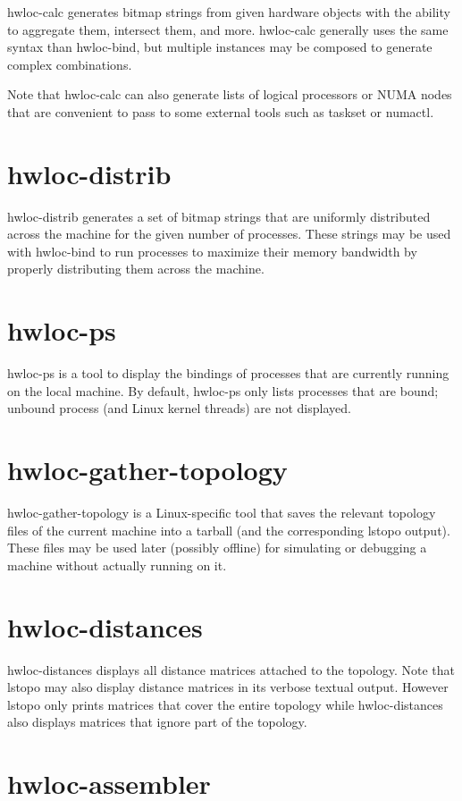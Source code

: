hwloc-\/calc generates bitmap strings from given hardware objects with the ability to aggregate them, intersect them, and more. hwloc-\/calc generally uses the same syntax than hwloc-\/bind, but multiple instances may be composed to generate complex combinations.

Note that hwloc-\/calc can also generate lists of logical processors or NUMA nodes that are convenient to pass to some external tools such as taskset or numactl.\hypertarget{a00002_cli_hwloc_distrib}{}\section{hwloc-\/distrib}\label{a00002_cli_hwloc_distrib}
hwloc-\/distrib generates a set of bitmap strings that are uniformly distributed across the machine for the given number of processes. These strings may be used with hwloc-\/bind to run processes to maximize their memory bandwidth by properly distributing them across the machine.\hypertarget{a00002_cli_hwloc_ps}{}\section{hwloc-\/ps}\label{a00002_cli_hwloc_ps}
hwloc-\/ps is a tool to display the bindings of processes that are currently running on the local machine. By default, hwloc-\/ps only lists processes that are bound; unbound process (and Linux kernel threads) are not displayed.\hypertarget{a00002_cli_hwloc_gather}{}\section{hwloc-\/gather-\/topology}\label{a00002_cli_hwloc_gather}
hwloc-\/gather-\/topology is a Linux-\/specific tool that saves the relevant topology files of the current machine into a tarball (and the corresponding lstopo output). These files may be used later (possibly offline) for simulating or debugging a machine without actually running on it.\hypertarget{a00002_cli_hwloc_distances}{}\section{hwloc-\/distances}\label{a00002_cli_hwloc_distances}
hwloc-\/distances displays all distance matrices attached to the topology. Note that lstopo may also display distance matrices in its verbose textual output. However lstopo only prints matrices that cover the entire topology while hwloc-\/distances also displays matrices that ignore part of the topology.\hypertarget{a00002_cli_hwloc_assembler}{}\section{hwloc-\/assembler}\label{a00002_cli_hwloc_assembler}
